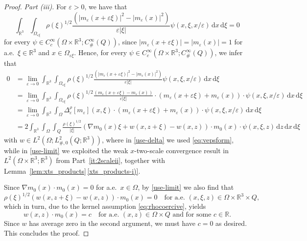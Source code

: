 \documentclass[reqno,11pt]{amsart}
\numberwithin{equation}{section}
\theoremstyle{thmlemcorr}
\numberwithin{theorem}{section}
\theoremstyle{thmlemcorr*}
\theoremstyle{defi}
\theoremstyle{remexample}
\theoremstyle{ass}
\newcommand{\R}{\mathbb{R}}
\renewcommand{\epsilon}{\varepsilon}
\newcommand{\dd}{\,\mathrm{d}}
\newcommand{\1}{\mathds{1}}
\newcommand{\Om}{\Omega}
\newcommand{\veps}{\varepsilon}
\begin{document}
\begin{proof}
    \textit{Part (iii).} %
    For $\veps > 0$, we have that
    \begin{equation*}
     \int_{\R^3} \int_{\Om_{\veps\xi}} \rho(\xi)^{1/2}\frac{(|m_\epsilon(x+\epsilon \xi)|^2-|m_\epsilon(x)|^2)}{\epsilon|\xi|}\psi(x,\xi,x/\epsilon)\dd x \dd \xi = 0   
    \end{equation*}
    for every $\psi \in C_c^{\infty}(\Omega \times \R^3;C_{\#}^{\infty}(Q))$, since $|m_\epsilon(x+\epsilon \xi)|=|m_\epsilon(x)| = 1 $ for a.e.\ $\xi \in \R^3$ and $x \in \Om_{\veps\xi}$.
    Hence, for every $\psi \in C_c^{\infty}(\Omega \times \R^3;C_{\#}^{\infty}(Q))$, we infer that
    \begin{align}
        0 &=\lim_{\epsilon\to 0}\int_{\R^3} \int_{\Om_{\veps\xi}}\rho(\xi)^{1/2}\frac{(|m_\epsilon(x+\epsilon \xi)|^2-|m_\epsilon(x)|^2)}{\epsilon|\xi|}\psi(x,\xi,x/\epsilon)\dd x \dd \xi \nonumber  \\ 
        &=\lim_{\epsilon\to 0}\int_{\R^3} \int_{\Om_{\veps\xi}}\rho(\xi)^{1/2}\frac{(m_\epsilon(x+\epsilon \xi)-m_\epsilon(x))}{\epsilon|\xi|}\cdot(m_\epsilon(x+\epsilon\xi)+m_\epsilon(x)) \cdot\psi(x,\xi,x/\epsilon)\dd x \dd \xi \nonumber \\
        &=\lim_{\epsilon\to 0}\int_{\R^3} \int_{\Omega}\Delta_\epsilon^\rho[m_\veps](x,\xi)\cdot(m_\epsilon(x+\epsilon\xi)+m_\epsilon(x)) \cdot\psi(x,\xi,x/\epsilon)\dd x \dd \xi \label{use-delta}\\
        &=2 \int_{\R^3} \int_{\Om} \int_{Q} \frac{\rho(\xi)^{1/2}}{|\xi|}\left(\nabla m_0(x)\xi+w(x,z+\xi)-w(x,z)\right)\cdot m_0(x) \cdot \psi(x,\xi,z)\dd z\dd x\dd \xi \label{use-limit}
    \end{align}
    with $w \in L^2(\Omega;L^2_{\#,0}(Q;\R^3))$,
where in \eqref{use-delta} we used  \eqref{eq:vepsform}, while in \eqref{use-limit} we exploited the weak $x$-two-scale convergence result in $L^2(\Omega\times\R^3;\R^3)$  from Part~\ref{it:2scaleii}, together with Lemma~\ref{lem:xts_products}\,\ref{xts_products-i)}. 

Since $\nabla m_0(x) \cdot m_0(x) =0$ for a.e.~$x \in \Omega$, by \eqref{use-limit} we also find that
\[
\rho(\xi)^{1/2}\left(w(x,z+\xi)-w(x,z)\right)\cdot m_0(x)=0 \quad \text{for a.e.~$(x,\xi,z) \in \Omega \times \R^3 \times Q$,}
\]
which in turn, due to the kernel assumption \eqref{eq:rhocoercive},  yields
\[
w(x,z)\cdot m_0(x)=c \quad \text{for a.e.~$(x,z) \in \Omega\times Q$ and for some } c \in \R.
\]
Since $w$ has average zero in the second argument, we must have $c=0$ as desired. This concludes the proof.
\end{proof}
\end{document}
